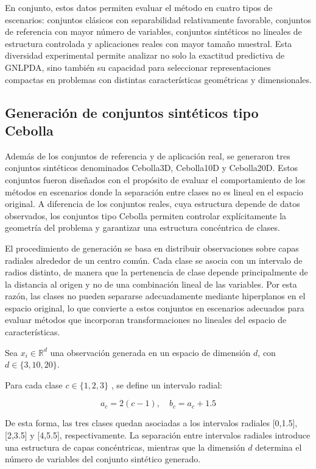 En conjunto, estos datos permiten evaluar el método en cuatro tipos de escenarios: conjuntos clásicos con separabilidad relativamente favorable, conjuntos de referencia con mayor número de variables, conjuntos sintéticos no lineales de estructura controlada y aplicaciones reales con mayor tamaño muestral. Esta diversidad experimental permite analizar no solo la exactitud predictiva de GNLPDA, sino también su capacidad para seleccionar representaciones compactas en problemas con distintas características geométricas y dimensionales.

\subsection{Generación de conjuntos sintéticos tipo Cebolla}

Además de los conjuntos de referencia y de aplicación real, se generaron tres conjuntos sintéticos denominados Cebolla3D, Cebolla10D y Cebolla20D. Estos conjuntos fueron diseñados con el propósito de evaluar el comportamiento de los métodos en escenarios donde la separación entre clases no es lineal en el espacio original. A diferencia de los conjuntos reales, cuya estructura depende de datos observados, los conjuntos tipo Cebolla permiten controlar explícitamente la geometría del problema y garantizar una estructura concéntrica de clases.

El procedimiento de generación se basa en distribuir observaciones sobre capas radiales alrededor de un centro común. Cada clase se asocia con un intervalo de radios distinto, de manera que la pertenencia de clase depende principalmente de la distancia al origen y no de una combinación lineal de las variables. Por esta razón, las clases no pueden separarse adecuadamente mediante hiperplanos en el espacio original, lo que convierte a estos conjuntos en escenarios adecuados para evaluar métodos que incorporan transformaciones no lineales del espacio de características.

Sea $x_i \in \mathbb{R}^d$ una observación generada en un espacio de dimensión $d$, con $d \in \{3,10,20\}$.

Para cada clase $c \in \{1,2,3\}$ , se define un intervalo radial:

\begin{equation}
	a_c = 2(c-1), \quad b_c = a_c + 1.5
	\label{eq:EM15}
\end{equation}

De esta forma, las tres clases quedan asociadas a los intervalos radiales [0,1.5], [2,3.5] y [4,5.5], respectivamente. La separación entre intervalos radiales introduce una estructura de capas concéntricas, mientras que la dimensión $d$ determina el número de variables del conjunto sintético generado.

